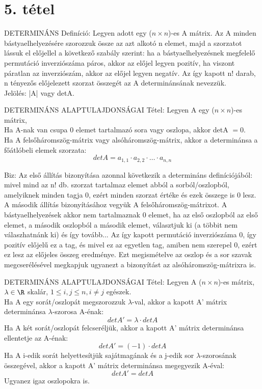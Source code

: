 \section{5. tétel}

\begin{shaded}
DETERMINÁNS Definíció: Legyen adott egy ($n \times n$)-es A mátrix. Az A minden bástyaelhelyezésére
szorozzuk össze az azt alkotó n elemet, majd a szorzatot lássuk el előjellel
a következő szabály szerint: ha a bástyaelhelyezésnek megfelelő permutáció inverziószáma
páros, akkor az előjel legyen pozitív, ha viszont páratlan az inverziószám,
akkor az előjel legyen negatív. Az így kapott n! darab, n tényezős előjelezett szorzat
összegét az A determinánsának nevezzük. \\
Jelölés: |A| vagy detA.
\end{shaded}
\begin{framed}
DETERMINÁNS ALAPTULAJDONSÁGAI Tétel: Legyen A egy ($n \times n$)-es mátrix,\\
Ha A-nak van csupa 0 elemet tartalmazó sora vagy oszlopa, akkor detA $= 0$.\\
Ha A felsőháromszög-mátrix vagy alsóháromszög-mátrix, akkor a determinánsa a főátlóbeli elemek szorzata: $$det A = a_{1,1}\cdot a_{2,2}\cdot \ldots\cdot a_{n,n}$$
\end{framed}
\begin{leftbar}
Biz: Az első állítás bizonyítása azonnal következik a determináns definíciójából: mivel mind az n! db. szorzat tartalmaz elemet abból a sorból/oszlopból, amelyiknek minden tagja 0, ezért minden szorzat értéke és ezek összege is 0 lesz.\\
A második állítás bizonyításához vegyük A felsőháromszög-mátrixot. A bástyaelhelyezések akkor nem tartalmaznak 0 elemet, ha az első oszlopból az első elemet, a második oszlopból a második elemet, választjuk ki (a többit nem válaszhatnánk ki) és így tovább... Az így kapott permutáció inverziószáma 0, így pozitív előjelű ez a tag, és mivel ez az egyetlen tag, amiben nem szerepel 0, ezért ez lesz az előjeles összeg eredménye. Ezt megismételve az oszlop és a sor szavak megcserélésével megkapjuk ugyanezt a bizonyítást az alsóháromszög-mátrixra is.
\end{leftbar}
\begin{framed}
DETERMINÁNS ALAPTULAJDONSÁGAI Tétel: Legyen A ($n\times n$)-es mátrix, $\lambda \in \R$ skalár, $1 \leq i,j\leq n, i \neq j$ egészek.\\
Ha A egy sorát/oszlopát megszorozzuk $\lambda$-val, akkor a kapott A' mátrix determinánsa $\lambda$-szorosa A-énak:$$detA' = \lambda\cdot detA$$
Ha A két sorát/oszlopát felcseréljük, akkor a kapott A' mátrix determinánsa ellentetje az A-énak:
$$detA' = (-1)\cdot detA$$
Ha A i-edik sorát helyettesítjük sajátmagának és a j-edik sor $\lambda$-szorosának összegével, akkor a kapott A' mátrix determinánsa megegyezik A-éval:
$$detA' = detA$$ Ugyanez igaz oszlopokra is.
\end{framed}
